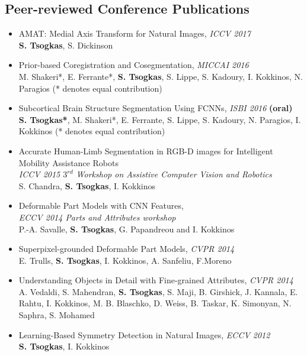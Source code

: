 \documentclass[margin]{res}
\begin{document}
\begin{resume}
\section{Peer-reviewed Conference Publications} 
	\begin{itemize}
		\item AMAT: Medial Axis Transform for Natural Images, \emph{ICCV 2017}\\
			\textbf{S. Tsogkas}, S. Dickinson 
		\item  Prior-based Coregistration and Cosegmentation, \emph{MICCAI 2016}\\
			M. Shakeri*, E. Ferrante*, \textbf{S. Tsogkas}, S. Lippe, S. Kadoury, I. Kokkinos,  N. Paragios (* denotes equal contribution)   
		\item  Subcortical Brain Structure Segmentation Using FCNNs, \emph{ISBI 2016} \textbf{(oral)}\\
			\textbf{S. Tsogkas*}, M. Shakeri*, E. Ferrante, S. Lippe, S. Kadoury, N. Paragios, I. Kokkinos (* denotes equal contribution)   
		\item   Accurate Human-Limb Segmentation in RGB-D images for Intelligent Mobility Assistance Robots\\
			\emph{ICCV 2015 $3^{rd}$ Workshop on Assistive Computer Vision and Robotics}\\
			S. Chandra, \textbf{S. Tsogkas}, I. Kokkinos
		\item  Deformable Part Models with CNN Features,\\ \emph{ECCV 2014 Parts and Attributes workshop}\\
		P.-A. Savalle, \textbf{S. Tsogkas}, G. Papandreou and I. Kokkinos 
		\item  Superpixel-grounded Deformable Part Models, \emph{CVPR 2014}\\
			E. Trulls, \textbf{S. Tsogkas}, I. Kokkinos, A. Sanfeliu, F.Moreno
		\item Understanding Objects in Detail with Fine-grained Attributes, \emph{CVPR 2014} \\
		A. Vedaldi, S. Mahendran, \textbf{S. Tsogkas}, S. Maji, B. Girshick, J. Kannala, E. Rahtu, I. Kokkinos, M. B. Blaschko, D. Weiss, B. Taskar, K. Simonyan, N. Saphra, S. Mohamed 
		\item Learning-Based Symmetry Detection in Natural Images, \emph{ECCV 2012} \\
			\textbf{S. Tsogkas}, I. Kokkinos
	\end{itemize}


\end{resume}
\end{document}

